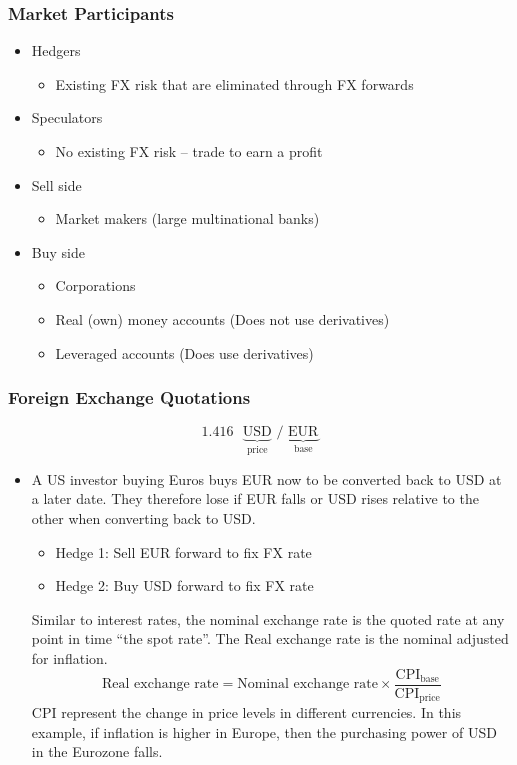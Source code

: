 \documentclass[../notes_compiled.tex]{subfiles}
\begin{document}
\subsubsection{Market Participants}
\begin{itemize}
\item Hedgers
\begin{itemize}
\item Existing FX risk that are eliminated through FX forwards
\end{itemize}
\item Speculators
\begin{itemize}
\item No existing FX risk -- trade to earn a profit
\end{itemize}
\item Sell side
\begin{itemize}
\item Market makers (large multinational banks)
\end{itemize}
\item Buy side
\begin{itemize}
\item Corporations
\item Real (own) money accounts (Does not use derivatives)
\item Leveraged accounts (Does use derivatives)
\end{itemize}
\end{itemize}

\subsubsection{Foreign Exchange Quotations}
\begin{equation*}
1.416 \text{ }\underbrace{\text{USD}}_{\text{price}} \text{ / } \underbrace{\text{EUR}}_{\text{base}}
\end{equation*}

\begin{itemize}
\item A US investor buying Euros buys EUR now to be converted back to USD at a later date. They therefore lose if EUR falls or USD rises relative to the other when converting back to USD.
\begin{itemize}
\item[] Hedge 1: Sell EUR forward to fix FX rate
\item[] Hedge 2: Buy USD forward to fix FX rate
\end{itemize}
Similar to interest rates, the nominal exchange rate is the quoted rate at any point in time ``the spot rate''. The Real exchange rate is the nominal adjusted for inflation.
\begin{equation}
\text{Real exchange rate} = \text{Nominal exchange rate} \times \frac{\text{CPI}_{\text{base}}}{\text{CPI}_{\text{price}}}
\end{equation}
CPI represent the change in price levels in different currencies. In this example, if inflation is higher in Europe, then the purchasing power of USD in the Eurozone falls.
\end{itemize}
\end{document}
